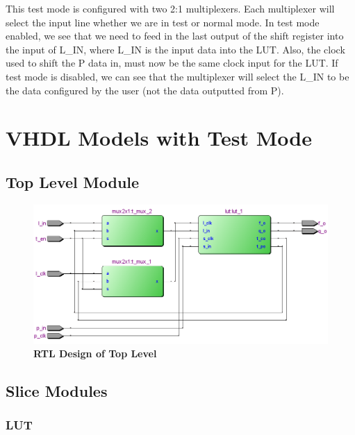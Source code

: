 \documentclass[a4paper]{article}
\begin{document}
    This test mode is configured with two 2:1 multiplexers. Each multiplexer will select the input line whether
    we are in test or normal mode. In test mode enabled, we see that we need to feed in the last output of the shift register
    into the input of L\_IN, where L\_IN is the input data into the LUT. Also, the clock used to shift the P data in,
    must now be the same clock input for the LUT. If test mode is disabled, we can see that the multiplexer will select
    the L\_IN to be the data configured by the user (not the data outputted from P).

    \newpage

\section{\textbf{VHDL Models with Test Mode}}

\subsection{\textbf{Top Level Module}}

    
    \begin{figure}[H]
        \centering
        \includegraphics[width=\textwidth,height=\textheight,keepaspectratio]{../../docs/rtl_pics/top_rtl.png}
        \caption{\textbf{RTL Design of Top Level}}
        \label{fig:gg}
    \end{figure}

    \newpage

\subsection{\textbf{Slice Modules}}
\subsubsection{\textbf{LUT}}
\end{document}
